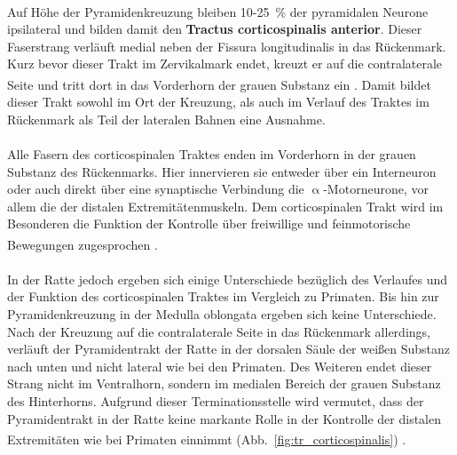 \documentclass[12pt,a4paper,pdftex]{article}
\begin{document}
\\ \noindent Auf Höhe der Pyramidenkreuzung bleiben 10-25~\% der pyramidalen Neurone ipsilateral und bilden damit den \textbf{Tractus corticospinalis anterior}. Dieser Faserstrang verläuft medial neben der Fissura longitudinalis in das  Rückenmark. Kurz bevor dieser Trakt im Zervikalmark endet, kreuzt er auf die contralaterale Seite und tritt dort in das Vorderhorn der grauen Substanz ein \textsuperscript{\cite[3]{trepel2011neuroanatomie}}. Damit bildet dieser Trakt sowohl im Ort der Kreuzung, als auch im Verlauf des Traktes im Rückenmark als Teil der lateralen Bahnen eine Ausnahme. \\
\\ \noindent Alle Fasern des corticospinalen Traktes enden im Vorderhorn in der grauen Substanz des Rückenmarks. Hier innervieren sie entweder über ein Interneuron oder auch direkt über eine synaptische Verbindung die $\upalpha$-Motorneurone, vor allem die der distalen Extremitätenmuskeln. Dem corticospinalen Trakt wird im Besonderen die Funktion der Kontrolle über freiwillige und feinmotorische Bewegungen zugesprochen \textsuperscript{\cite[3]{trepel2011neuroanatomie}}. \\
\\ \noindent In der Ratte jedoch ergeben sich einige Unterschiede bezüglich des Verlaufes und der Funktion des corticospinalen Traktes im Vergleich zu Primaten. Bis hin zur Pyramidenkreuzung in der Medulla oblongata ergeben sich keine Unterschiede. Nach der Kreuzung auf die contralaterale Seite in das Rückenmark allerdings, verläuft der Pyramidentrakt der Ratte in der dorsalen Säule der weißen Substanz nach unten und nicht lateral wie bei den Primaten. Des Weiteren endet dieser Strang nicht im Ventralhorn, sondern im medialen Bereich der grauen Substanz des Hinterhorns. Aufgrund dieser Terminationsstelle wird vermutet, dass der Pyramidentrakt in der Ratte keine markante Rolle in der Kontrolle der distalen Extremitäten wie bei Primaten einnimmt (Abb.~\ref{fig:tr_corticospinalis}) \textsuperscript{\cite[8]{paxinos2014rat}}.  
\end{document}
